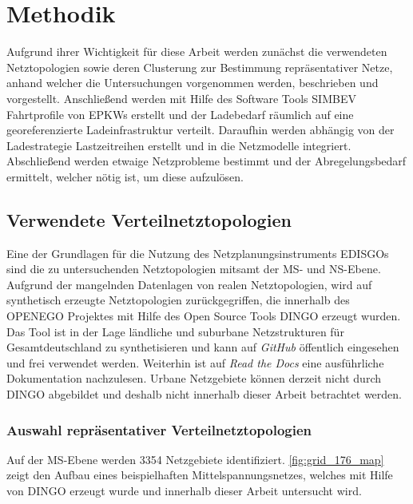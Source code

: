 	\section{Methodik}\label{chap:Methodik}

Aufgrund ihrer Wichtigkeit für diese Arbeit werden zunächst die verwendeten Netztopologien sowie deren Clusterung zur Bestimmung repräsentativer Netze, anhand welcher die Untersuchungen vorgenommen werden, beschrieben und vorgestellt.
Anschließend werden mit Hilfe des Software Tools \gls{SIMBEV} Fahrtprofile von \glspl{EPKW} erstellt und der Ladebedarf räumlich auf eine georeferenzierte Ladeinfrastruktur verteilt.
Daraufhin werden abhängig von der Ladestrategie Lastzeitreihen erstellt und in die Netzmodelle integriert.
Abschließend werden etwaige Netzprobleme bestimmt und der Abregelungsbedarf ermittelt, welcher nötig ist, um diese aufzulösen.


\subsection{Verwendete Verteilnetztopologien}\label{chap:dingo_theo}

Eine der Grundlagen für die Nutzung des Netzplanungsinstruments \glspl{EDISGO} sind die zu untersuchenden Netztopologien mitsamt der \gls{MS}- und \gls{NS}-Ebene.
Aufgrund der mangelnden Datenlagen von realen Netztopologien, wird auf synthetisch erzeugte Netztopologien zurückgegriffen, die innerhalb des \gls{OPENEGO} Projektes \cite{Mueller2019} mit Hilfe des Open Source Tools \gls{DINGO} erzeugt wurden.
Das Tool ist in der Lage ländliche und suburbane Netzstrukturen für Gesamtdeutschland zu synthetisieren und kann auf \textit{GitHub} \cite{dingo2019} öffentlich eingesehen und frei verwendet werden.
Weiterhin ist auf \textit{Read the Docs} \cite{dingo-docs2019} eine ausführliche Dokumentation nachzulesen.
Urbane Netzgebiete können derzeit nicht durch \gls{DINGO} abgebildet und deshalb nicht innerhalb dieser Arbeit betrachtet werden.\medskip


\subsubsection{Auswahl repräsentativer Verteilnetztopologien}

Auf der \gls{MS}-Ebene werden \num{3354} Netzgebiete \cite{Schachler} identifiziert.
\autoref{fig:grid_176_map} zeigt den Aufbau eines beispielhaften Mittelspannungsnetzes, welches mit Hilfe von \gls{DINGO} erzeugt wurde und innerhalb dieser Arbeit untersucht wird.

